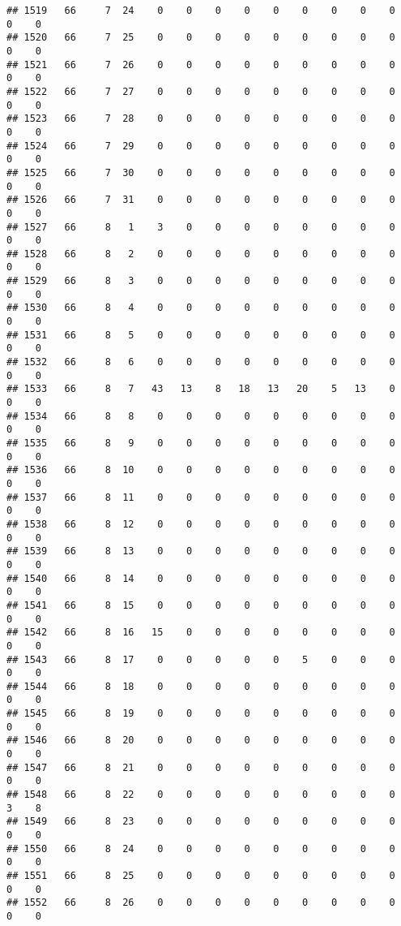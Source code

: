 \documentclass[]{article}
\begin{document}
\begin{verbatim}
## 1519   66     7  24    0    0    0    0    0    0    0    0    0    0    0
## 1520   66     7  25    0    0    0    0    0    0    0    0    0    0    0
## 1521   66     7  26    0    0    0    0    0    0    0    0    0    0    0
## 1522   66     7  27    0    0    0    0    0    0    0    0    0    0    0
## 1523   66     7  28    0    0    0    0    0    0    0    0    0    0    0
## 1524   66     7  29    0    0    0    0    0    0    0    0    0    0    0
## 1525   66     7  30    0    0    0    0    0    0    0    0    0    0    0
## 1526   66     7  31    0    0    0    0    0    0    0    0    0    0    0
## 1527   66     8   1    3    0    0    0    0    0    0    0    0    0    0
## 1528   66     8   2    0    0    0    0    0    0    0    0    0    0    0
## 1529   66     8   3    0    0    0    0    0    0    0    0    0    0    0
## 1530   66     8   4    0    0    0    0    0    0    0    0    0    0    0
## 1531   66     8   5    0    0    0    0    0    0    0    0    0    0    0
## 1532   66     8   6    0    0    0    0    0    0    0    0    0    0    0
## 1533   66     8   7   43   13    8   18   13   20    5   13    0    0    0
## 1534   66     8   8    0    0    0    0    0    0    0    0    0    0    0
## 1535   66     8   9    0    0    0    0    0    0    0    0    0    0    0
## 1536   66     8  10    0    0    0    0    0    0    0    0    0    0    0
## 1537   66     8  11    0    0    0    0    0    0    0    0    0    0    0
## 1538   66     8  12    0    0    0    0    0    0    0    0    0    0    0
## 1539   66     8  13    0    0    0    0    0    0    0    0    0    0    0
## 1540   66     8  14    0    0    0    0    0    0    0    0    0    0    0
## 1541   66     8  15    0    0    0    0    0    0    0    0    0    0    0
## 1542   66     8  16   15    0    0    0    0    0    0    0    0    0    0
## 1543   66     8  17    0    0    0    0    0    5    0    0    0    0    0
## 1544   66     8  18    0    0    0    0    0    0    0    0    0    0    0
## 1545   66     8  19    0    0    0    0    0    0    0    0    0    0    0
## 1546   66     8  20    0    0    0    0    0    0    0    0    0    0    0
## 1547   66     8  21    0    0    0    0    0    0    0    0    0    0    0
## 1548   66     8  22    0    0    0    0    0    0    0    0    0    3    8
## 1549   66     8  23    0    0    0    0    0    0    0    0    0    0    0
## 1550   66     8  24    0    0    0    0    0    0    0    0    0    0    0
## 1551   66     8  25    0    0    0    0    0    0    0    0    0    0    0
## 1552   66     8  26    0    0    0    0    0    0    0    0    0    0    0

\end{verbatim}
\end{document}
